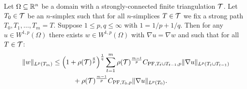 \documentclass[10pt,letterpaper]{article}
\begin{document}
\begin{theorem}\label{theorem:poincarefriedrichsestimate:grad}
    Let $\Omega \subseteq {\mathbb R}^{n}$ be a domain with a strongly-connected finite triangulation ${\mathcal T}$.
    Let $T_0 \in {\mathcal T}$ be an $n$-simplex such that for all $n$-simplices $T \in {\mathcal T}$ 
    we fix a strong path $T_0, T_1, \dots, T_m = T$.
    Suppose $1 \leq p,q \leq \infty$ with $1 = 1/p + 1/q$.
    Then for any $u \in W^{1,p}(\Omega)$ 
    there exists $w \in W^{1,p}(\Omega)$ with $\nabla u = \nabla w$ 
    and such that for all $T \in {\mathcal T}$:
    \begin{align*} 
        \| w \|_{L^{p}(T_m)}
        &\leq 
        \left( 1 + \rho({\mathcal T})^{\frac q p} \right)^{\frac 1 q}
        \sum_{t=1}^{m}
        \rho({\mathcal T})^{\frac{m-t}{p}}
        C_{{\rm{PF}},T_{t} \cup T_{t-1},p}
        \| \nabla u \|_{L^{p}(T_{t} \cup T_{t-1})}
        \\&\quad \quad \quad 
        +
        \rho({\mathcal T})^{\frac{m-1}{p}}
        C_{{\rm{PF}},T_{0},p}
        \| \nabla u \|_{L^{p}(T_{0})}
        .
    \end{align*}
\end{theorem}
\end{document}
